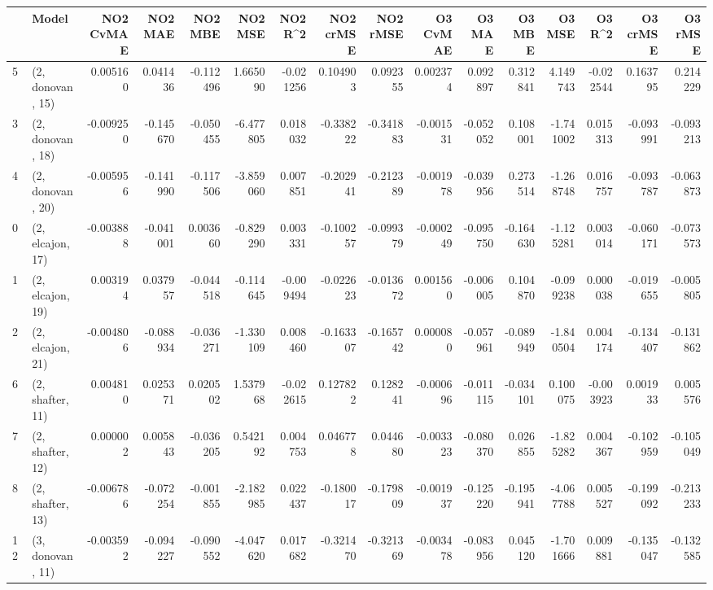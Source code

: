 \begin{tabular}{llrrrrrrrrrrrrrr}
\toprule
{} &             Model &  NO2 CvMAE &   NO2 MAE &   NO2 MBE &    NO2 MSE &   NO2 R\textasciicircum2 &  NO2 crMSE &  NO2 rMSE &  O3 CvMAE &    O3 MAE &    O3 MBE &     O3 MSE &    O3 R\textasciicircum2 &  O3 crMSE &   O3 rMSE \\
\midrule
5  &  (2, donovan, 15) &   0.005160 &  0.041436 & -0.112496 &   1.665090 & -0.021256 &   0.104903 &  0.092355 &  0.002374 &  0.092897 &  0.312841 &   4.149743 & -0.022544 &  0.163795 &  0.214229 \\
3  &  (2, donovan, 18) &  -0.009250 & -0.145670 & -0.050455 &  -6.477805 &  0.018032 &  -0.338222 & -0.341883 & -0.001531 & -0.052052 &  0.108001 &  -1.741002 &  0.015313 & -0.093991 & -0.093213 \\
4  &  (2, donovan, 20) &  -0.005956 & -0.141990 & -0.117506 &  -3.859060 &  0.007851 &  -0.202941 & -0.212389 & -0.001978 & -0.039956 &  0.273514 &  -1.268748 &  0.016757 & -0.093787 & -0.063873 \\
0  &  (2, elcajon, 17) &  -0.003888 & -0.041001 &  0.003660 &  -0.829290 &  0.003331 &  -0.100257 & -0.099379 & -0.000249 & -0.095750 & -0.164630 &  -1.125281 &  0.003014 & -0.060171 & -0.073573 \\
1  &  (2, elcajon, 19) &   0.003194 &  0.037957 & -0.044518 &  -0.114645 & -0.009494 &  -0.022623 & -0.013672 &  0.001560 & -0.006005 &  0.104870 &  -0.099238 &  0.000038 & -0.019655 & -0.005805 \\
2  &  (2, elcajon, 21) &  -0.004806 & -0.088934 & -0.036271 &  -1.330109 &  0.008460 &  -0.163307 & -0.165742 &  0.000080 & -0.057961 & -0.089949 &  -1.840504 &  0.004174 & -0.134407 & -0.131862 \\
6  &  (2, shafter, 11) &   0.004810 &  0.025371 &  0.020502 &   1.537968 & -0.022615 &   0.127822 &  0.128241 & -0.000696 & -0.011115 & -0.034101 &   0.100075 & -0.003923 &  0.001933 &  0.005576 \\
7  &  (2, shafter, 12) &   0.000002 &  0.005843 & -0.036205 &   0.542192 &  0.004753 &   0.046778 &  0.044680 & -0.003323 & -0.080370 &  0.026855 &  -1.825282 &  0.004367 & -0.102959 & -0.105049 \\
8  &  (2, shafter, 13) &  -0.006786 & -0.072254 & -0.001855 &  -2.182985 &  0.022437 &  -0.180017 & -0.179809 & -0.001937 & -0.125220 & -0.195941 &  -4.067788 &  0.005527 & -0.199092 & -0.213233 \\
12 &  (3, donovan, 11) &  -0.003592 & -0.094227 & -0.090552 &  -4.047620 &  0.017682 &  -0.321470 & -0.321369 & -0.003478 & -0.083956 &  0.045120 &  -1.701666 &  0.009881 & -0.135047 & -0.132585 \\

\end{tabular}
